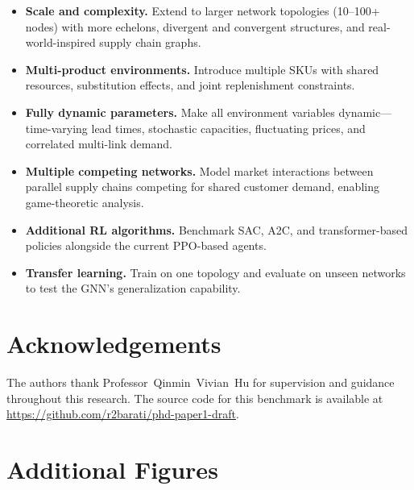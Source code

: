 \documentclass[preprint,12pt]{elsarticle}
\begin{document}
\begin{itemize}
  \item \textbf{Scale and complexity.} Extend to larger network
        topologies (10--100+ nodes) with more echelons, divergent
        and convergent structures, and real-world-inspired supply
        chain graphs.
  \item \textbf{Multi-product environments.} Introduce multiple
        SKUs with shared resources, substitution effects, and
        joint replenishment constraints.
  \item \textbf{Fully dynamic parameters.} Make all environment
        variables dynamic---time-varying lead times, stochastic
        capacities, fluctuating prices, and correlated multi-link
        demand.
  \item \textbf{Multiple competing networks.} Model market
        interactions between parallel supply chains competing for
        shared customer demand, enabling game-theoretic analysis.
  \item \textbf{Additional RL algorithms.} Benchmark SAC, A2C,
        and transformer-based policies alongside the current
        PPO-based agents.
  \item \textbf{Transfer learning.} Train on one topology and
        evaluate on unseen networks to test the GNN's
        generalization capability.
\end{itemize}


\section*{Acknowledgements}
The authors thank Professor~Qinmin~Vivian~Hu for supervision and guidance
throughout this research. The source code for this benchmark is
available at \url{https://github.com/r2barati/phd-paper1-draft}.





\appendix

\section{Additional Figures}\label{app:figures}
\end{document}
